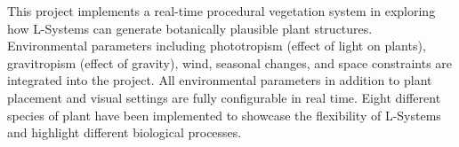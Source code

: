 This project implements a real-time procedural vegetation system in exploring how L-Systems can generate
botanically plausible plant structures. Environmental parameters including phototropism (effect of light on
plants), gravitropism (effect of gravity), wind, seasonal changes, and space constraints are integrated into
the project. All environmental parameters in addition to plant placement and visual settings are fully
configurable in real time. Eight different species of plant have been implemented to showcase the flexibility
of L-Systems and highlight different biological processes.
